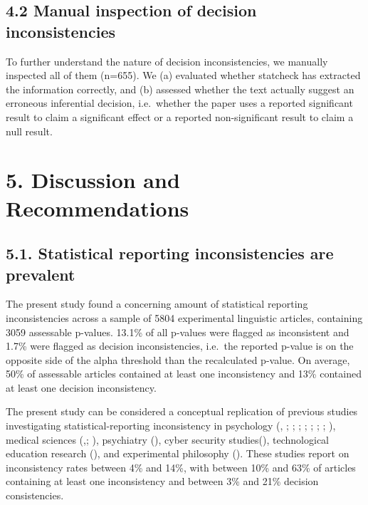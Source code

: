 \documentclass[
  doc,
  longtable,
  nolmodern,
  notxfonts,
  notimes,
  colorlinks=true,linkcolor=blue,citecolor=blue,urlcolor=blue]{apa7}
\begin{document}
\subsection{4.2 Manual inspection of decision
inconsistencies}\label{manual-inspection-of-decision-inconsistencies}

To further understand the nature of decision inconsistencies, we
manually inspected all of them (n=655). We (a) evaluated whether
statcheck has extracted the information correctly, and (b) assessed
whether the text actually suggest an erroneous inferential decision,
i.e.~whether the paper uses a reported significant result to claim a
significant effect or a reported non-significant result to claim a null
result.

\section{5. Discussion and
Recommendations}\label{discussion-and-recommendations}

\subsection{5.1. Statistical reporting inconsistencies are
prevalent}\label{statistical-reporting-inconsistencies-are-prevalent}

The present study found a concerning amount of statistical reporting
inconsistencies across a sample of 5804 experimental linguistic
articles, containing 3059 assessable p-values. 13.1\% of all p-values
were flagged as inconsistent and 1.7\% were flagged as decision
inconsistencies, i.e.~the reported p-value is on the opposite side of
the alpha threshold than the recalculated p-value. On average, 50\% of
assessable articles contained at least one inconsistency and 13\%
contained at least one decision inconsistency.

The present study can be considered a conceptual replication of previous
studies investigating statistical-reporting inconsistency in psychology
(,
;
;
;
;
;
;
;
), medical
sciences (,; ), psychiatry (), cyber security
studies(), technological
education research (), and experimental philosophy
(). These
studies report on inconsistency rates between 4\% and 14\%, with between
10\% and 63\% of articles containing at least one inconsistency and
between 3\% and 21\% decision consistencies.
\end{document}
